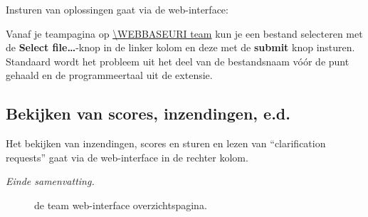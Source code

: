 Insturen van oplossingen gaat via%
de web-interface:
\begin{description}[\breaklabel\setlabelstyle{\bfseries}]
\item[Web-Interface]
Vanaf je teampagina op \url{\WEBBASEURI team} kun je een bestand
selecteren met de \textbf{Select file\ldots}-knop in de linker kolom en deze met
de \textbf{submit} knop insturen.
Standaard wordt het probleem uit het deel van de bestandsnaam v\'o\'or de
punt gehaald en de programmeertaal uit de extensie.

\end{description}

\subsection*{Bekijken van scores, inzendingen, e.d.}

Het bekijken van inzendingen, scores en sturen en lezen van
``clarification requests'' gaat via de web-interface in de rechter kolom.

\emph{Einde samenvatting.}

\begin{figure}[p]
  \centering
  \caption{de team web-interface overzichtspagina.}
  \label{fig:team-overview}
\end{figure}

